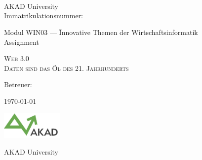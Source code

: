 

\begin{titlepage}


\vspace{5cm}

\Name \\ 
\Strasse \\ 
\PlzOrt\\ 
\href{mailto:\Email}{\Email}

AKAD University\\
Immatrikulationsnummer: \Immatrikulationsnummer

\vfill

\begin{tabbing}
Modul WIN03 --- \=Innovative Themen der Wirtschaftsinformatik\\ 
				\>Assignment
\end{tabbing}

\LARGE
\textsc{Web 3.0 \\Daten sind das Öl des 21. Jahrhunderts}\\

\vfill

\normalsize

Betreuer: \Betreuer

\today %

\vfill

\includegraphics[width=3cm]{akad_logo.png}

AKAD University

\end{titlepage}

\normalsize
